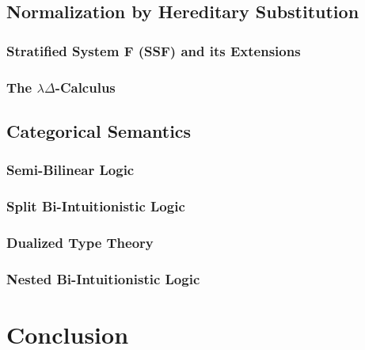 \subsection{Normalization by Hereditary Substitution}
\label{subsec:normalization_by_hereditary_substitution}
\subsubsection{Stratified System F (SSF) and its Extensions}
\label{subsec:stratified_system_f_ext}


\subsubsection{The $\lambda\Delta$-Calculus}
\label{subsec:the_lambdadelta-calculus}



\subsection{Categorical Semantics}
\label{subsec:categorical_semantics}
\subsubsection{Semi-Bilinear Logic}
\label{subsec:semi-bilinear_logic}


\subsubsection{Split Bi-Intuitionistic Logic}
\label{subsec:split_bi-intuitionistic_logic}


\subsubsection{Dualized Type Theory}
\label{subsubsec:dualized_type_theory}


\subsubsection{Nested Bi-Intuitionistic Logic}
\label{subsec:nested_bi-intuitionistic_logic}



 
\section{Conclusion}
\label{sec:conclusion}





